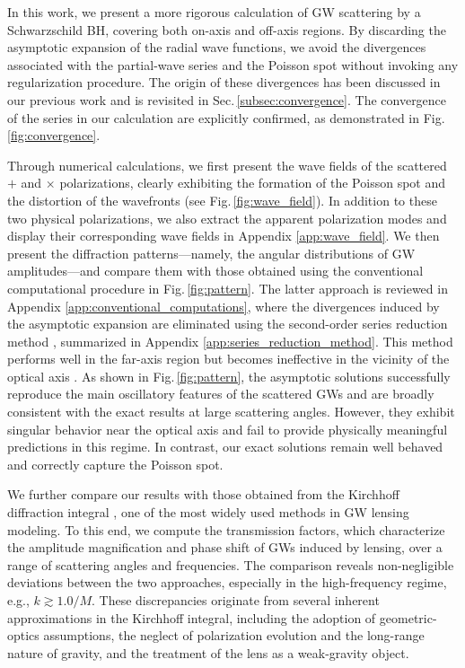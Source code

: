 \documentclass[reprint,amsmath,amssymb,aps,prd]{revtex4-2}
\begin{document}
In this work, we present a more rigorous calculation of GW scattering by a Schwarzschild BH, covering both on-axis and off-axis regions. By discarding the asymptotic expansion of the radial wave functions, we avoid the divergences associated with the partial-wave series and the Poisson spot without invoking any regularization procedure. The origin of these divergences has been discussed in our previous work \cite{Li_2025_b} and is revisited in Sec.\,\ref{subsec:convergence}. The convergence of the series in our calculation are explicitly confirmed, as demonstrated in Fig.\,\ref{fig:convergence}.

Through numerical calculations, we first present the wave fields of the scattered $+$ and $\times$ polarizations, clearly exhibiting the formation of the Poisson spot and the distortion of the wavefronts (see Fig.\,\ref{fig:wave_field}). In addition to these two physical polarizations, we also extract the apparent polarization modes and display their corresponding wave fields in Appendix \ref{app:wave_field}. We then present the diffraction patterns—namely, the angular distributions of GW amplitudes—and compare them with those obtained using the conventional computational procedure in Fig.\,\ref{fig:pattern}. The latter approach is reviewed in Appendix \ref{app:conventional_computations}, where the divergences induced by the asymptotic expansion are eliminated using the second-order series reduction method \cite{Stratton_2020}, summarized in Appendix \ref{app:series_reduction_method}. This method performs well in the far-axis region but becomes ineffective in the vicinity of the optical axis \cite{Chan_2025}. As shown in Fig.\,\ref{fig:pattern}, the asymptotic solutions successfully reproduce the main oscillatory features of the scattered GWs and are broadly consistent with the exact results at large scattering angles. However, they exhibit singular behavior near the optical axis and fail to provide physically meaningful predictions in this regime. In contrast, our exact solutions remain well behaved and correctly capture the Poisson spot.

We further compare our results with those obtained from the Kirchhoff diffraction integral \cite{Takahashi_2003}, one of the most widely used methods in GW lensing modeling. To this end, we compute the transmission factors, which characterize the amplitude magnification and phase shift of GWs induced by lensing, over a range of scattering angles and frequencies. The comparison reveals non-negligible deviations between the two approaches, especially in the high-frequency regime, e.g., $k\gtrsim1.0/M$. These discrepancies originate from several inherent approximations in the Kirchhoff integral, including the adoption of geometric-optics assumptions, the neglect of polarization evolution and the long-range nature of gravity, and the treatment of the lens as a weak-gravity object.
\end{document}
